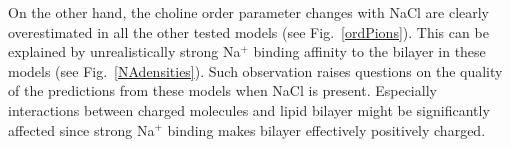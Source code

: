 \documentclass[pre,aps,floatfix,authordate1-4,twocolumn]{revtex4-1}
\begin{document}


On the other hand, the choline order parameter changes with NaCl are clearly overestimated in all the other tested models (see Fig.~\ref{ordPions}).
This can be explained by unrealistically strong Na$^+$ binding affinity to the bilayer in these models (see Fig.~\ref{NAdensities}). 
Such observation raises questions on the quality of the predictions from these models when NaCl is present.
Especially interactions between charged molecules and lipid bilayer might be significantly
affected since strong Na$^+$ binding makes bilayer effectively positively charged.
\end{document}
